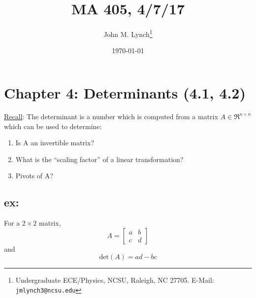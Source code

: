 \documentclass[twocolumn,draft]{article}
\title{MA 405, 4/7/17}
\author{John M. Lynch\footnote{Undergraduate ECE/Physics, NCSU, Raleigh, NC 27705. E-Mail: \texttt{jmlynch3@ncsu.edu}}}
\date{\today}
\begin{document}
  \maketitle
  \section*{Chapter 4: Determinants (4.1, 4.2)}
  
  \underline{Recall}: The determinant is a number which is computed from a matrix
  $A\in\Re^{n\times n}$ which can be used to determine:
  
  \begin{enumerate}
  	\item Is A an invertible matrix?
	\item What is the ``scaling factor'' of a linear transformation?
	\item Pivots of A?
  \end{enumerate}
  
  \subsection*{ex:} For a $2\times 2$ matrix,
  \begin{equation*}
  	A=\begin{bmatrix}
  		a & b \\ c & d
  	\end{bmatrix}
  \end{equation*}
  and
  \begin{equation*}
  	\text{det}(A) = ad - bc
  \end{equation*}
  
\end{document}
